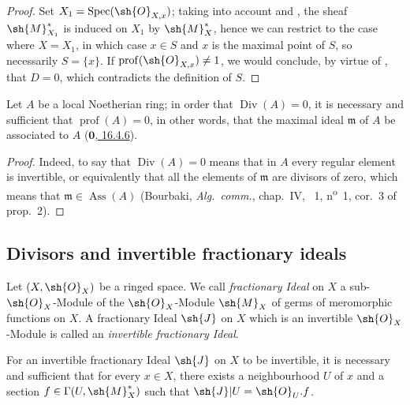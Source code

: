 \begin{proof}
Set $X_1=\operatorname{Spec}(\sh{O}_{X,x})$;
taking into account  and , the sheaf $\sh{M}_{X_1}^*$ is induced on $X_1$ by $\sh{M}_X^*$, hence we can restrict to the case where $X=X_1$, in which case $x\in S$ and $x$ is the maximal point of $S$, so necessarily $S=\{x\}$.
If $\operatorname{prof}(\sh{O}_{X,x})\neq 1$, we would conclude, by virtue of , that $D=0$, which contradicts the definition of $S$.
\end{proof}

\begin{proposition}[21.1.10]
\label{IV.21.1.10}
Let $A$ be a local Noetherian ring;
in order that $\operatorname{Div}(A)=0$, it is necessary and sufficient that $\operatorname{prof}(A)=0$, in other words, that the maximal ideal $\mathfrak{m}$ of $A$ be associated to $A$
(\hyperref[0.16.4.6]{$\mathbf{0}$, 16.4.6}).
\end{proposition}

\begin{proof}
Indeed, to say that $\operatorname{Div}(A)=0$ means that in $A$ every regular element is invertible, or equivalently that all the elements of $\mathfrak{m}$ are divisors of zero, which means that $\mathfrak{m}\in\operatorname{Ass}(A)$ (Bourbaki, \emph{Alg.\ comm.}, chap.~IV, \textsection~1, n\textsuperscript{o}~1, cor.~3 of prop.~2).
\end{proof}

\subsection{Divisors and invertible fractionary ideals}
\label{subsection:IV.21.2}

\begin{env}[21.2.1]
\label{IV.21.2.1}
Let $(X,\sh{O}_X)$ be a ringed space.
We call \emph{fractionary Ideal} on $X$ a sub-$\sh{O}_X$-Module of the $\sh{O}_X$-Module $\sh{M}_X$ of germs of meromorphic functions on $X$.
A fractionary Ideal $\sh{J}$ on $X$ which is an invertible $\sh{O}_X$-Module is called an \emph{invertible fractionary Ideal}.
\end{env}

\begin{proposition}[21.2.2]
\label{IV.21.2.2}
For an invertible fractionary Ideal $\sh{J}$ on $X$ to be invertible, it is necessary and sufficient that for every $x\in X$, there exists a neighbourhood $U$ of $x$ and a section $f\in\Gamma(U,\sh{M}_X^*)$ such that $\sh{J}|U=\sh{O}_U.f$.
\end{proposition}


